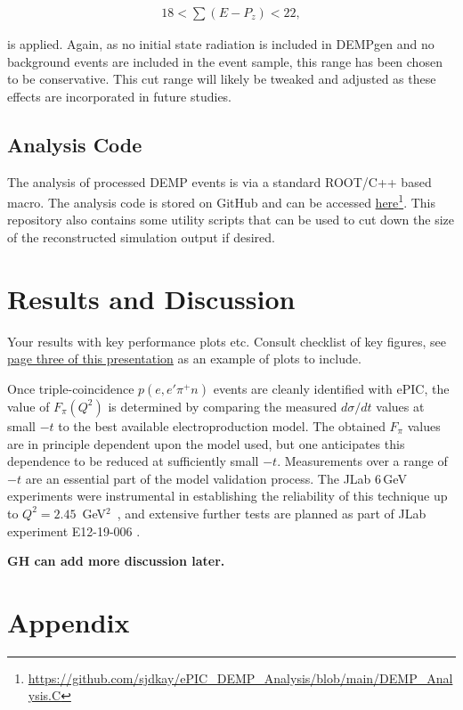\documentclass[letterpaper,12pt]{article}
\begin{document}
\begin{gather*}
    18 < \sum \left(E - P_{z}\right) < 22,
\end{gather*}

is applied. Again, as no initial state radiation is included in DEMPgen and no background events are included in the event sample, this range has been chosen to be conservative. This cut range will likely be tweaked and adjusted as these effects are incorporated in future studies.

\subsection{Analysis Code}\label{subsec:Analysis_Code}

The analysis of processed DEMP events is via a standard ROOT/C++ based macro. The analysis code is stored on GitHub and can be accessed \href{https://github.com/sjdkay/ePIC_DEMP_Analysis/blob/main/DEMP_Analysis.C}{here}\footnote{\url{https://github.com/sjdkay/ePIC_DEMP_Analysis/blob/main/DEMP_Analysis.C}}. This repository also contains some utility scripts that can be used to cut down the size of the reconstructed simulation output if desired. 

\section{Results and Discussion}\label{sec:Results_Discuss}

Your results with key performance plots etc. Consult checklist of key figures, see \href{https://docs.google.com/presentation/d/1bqz9_GPvPoW4oz1m8KvzuUhPJZBe_CfU5APMt0LjfaU/edit?slide=id.g3338e3f4b69_0_51#slide=id.g3338e3f4b69_0_51}{page three of this presentation} as an example of plots to include.

Once triple-coincidence $p(e,e'\pi^+n)$ events are cleanly identified with ePIC, the value of $F_{\pi}(Q^2)$ is determined by comparing the measured $d\sigma/dt$ values at small $-t$ to the best available electroproduction model. The obtained $F_{\pi}$ values are in principle dependent upon the model used, but one anticipates this dependence to be reduced at sufficiently small $-t$. Measurements over a range of $-t$ are an essential part of the model validation process. The JLab 6\,GeV experiments were instrumental in establishing the reliability of this technique up to $Q^2=2.45$~GeV$^2$~\cite{Huber:2008id, Horn:2016rip, Horn:2007ug, Volmer:2000ek, Horn:2006tm, Tadevosyan:2007yd, Blok:2008jy, Huber:2014ius, Huber:2014kar}, and extensive further tests are planned as part of JLab experiment E12-19-006 \cite{E12-19-006}.

{\bf GH can add more discussion later.}

\pagebreak
\appendix
\section{Appendix}


 

\end{document}

